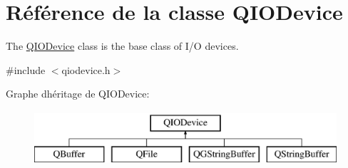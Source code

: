 \hypertarget{class_q_i_o_device}{}\section{Référence de la classe Q\+I\+O\+Device}
\label{class_q_i_o_device}


The \hyperlink{class_q_i_o_device}{Q\+I\+O\+Device} class is the base class of I/\+O devices.  




{\ttfamily \#include $<$qiodevice.\+h$>$}

Graphe d\textquotesingle{}héritage de Q\+I\+O\+Device\+:\begin{figure}[H]
\begin{center}
\leavevmode
\includegraphics[height=2.000000cm]{class_q_i_o_device}
\end{center}
\end{figure}
